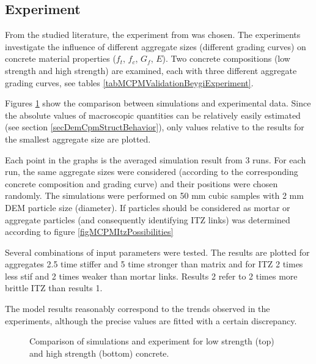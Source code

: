 \subsection{Experiment \cite{BeygiEtAl2014a,BeygiEtAl2014b,NikbinEtAl2014a}}

From the studied literature, the experiment from \cite{BeygiEtAl2014a,BeygiEtAl2014b,NikbinEtAl2014a} was chosen.
The experiments investigate the influence of different aggregate sizes (different grading curves) on concrete material properties ($f_t$, $f_c$, $G_f$, $E$).
Two concrete compositions (low strength and high strength) are examined, each with three different aggregate grading curves, see tables \ref{tabMCPMValidationBeygiExperiment}.

Figures \ref{figMCPMValidation} show the comparison between simulations and experimental data.
Since the absolute values of macroscopic quantities can be relatively easily estimated (see section \ref{secDemCpmStructBehavior}), only values relative to the results for the smallest aggregate size are plotted.

Each point in the graphs is the averaged simulation result from 3 runs.
For each run, the same aggregate sizes were considered (according to the corresponding concrete composition and grading curve) and their positions were chosen randomly.
The simulations were performed on 50 mm cubic samples with 2 mm DEM particle size (diameter).
If particles should be considered as mortar or aggregate particles (and consequently identifying ITZ links) was determined according to figure \ref{figMCPMItzPossibilities}

Several combinations of input parameters were tested. The results are plotted for
aggregates 2.5 time stiffer and 5 time stronger than matrix
and for
ITZ 2 times less stif and 2 times weaker than mortar links.
Results 2 refer to 2 times more brittle ITZ than results 1.

The model results reasonably correspond to the trends observed in the experiments, although the precise values are fitted with a certain discrepancy.



\begin{figure}[htbp]
	\centering
	\caption[Comparison of simulations and experiment]{Comparison of simulations and experiment \cite{BeygiEtAl2014a,BeygiEtAl2014b,NikbinEtAl2014a} for low strength (top) and high strength (bottom) concrete.}
	\label{figMCPMValidation}
\end{figure}
